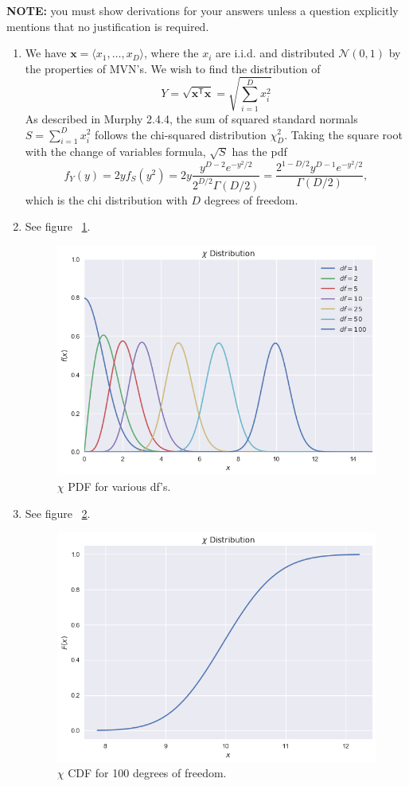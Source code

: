 \documentclass[submit]{harvardml}
\newcommand{\trans}{\mathsf{T}}
\newcommand{\bx}{\mathbf{x}}
\newcommand{\distNorm}{\mathcal{N}}
\begin{document}
\noindent \textbf{NOTE:} you must show derivations for your answers unless a question explicitly mentions that no justification is required.



\begin{enumerate}
	\item We have $\bx = \langle x_1, \dots, x_D \rangle$, where the $x_i$ are i.i.d. and distributed $\distNorm(0, 1)$ by the properties of MVN's. We wish to find the distribution of
	\[Y = \sqrt{\bx^\trans\bx} = \sqrt{\sum_{i=1}^D x_i^2}\]
	As described in Murphy 2.4.4, the sum of squared standard normals $S = \sum_{i=1}^D x_i^2$ follows the chi-squared distribution $\chi_D^2$. Taking the square root with the change of variables formula, $\sqrt{S}$ has the pdf
	\[
	f_Y(y) 
	= 2y f_S(y^2)
	= 2y\frac{y^{D-2}e^{-y^2 / 2}}{2^{D/2}\Gamma(D/2)}
	= \frac{2^{1 - D/2} y^{D-1} e^{-y^2/2}}{\Gamma(D/2)},
	\]
	which is the chi distribution with $D$ degrees of freedom.
	
	\item See figure ~\ref{1-2}.
	\begin{figure}
		\centering
		\includegraphics[width=.75\textwidth]{1-2}
		\caption{$\chi$ PDF for various df's.}
		\label{1-2}
	\end{figure}
	
	\item See figure ~\ref{1-3}.
	\begin{figure}
		\centering
		\includegraphics[width=.75\textwidth]{1-3}
		\caption{$\chi$ CDF for 100 degrees of freedom.}
		\label{1-3}
	\end{figure}
	

\end{enumerate}
\end{document}
